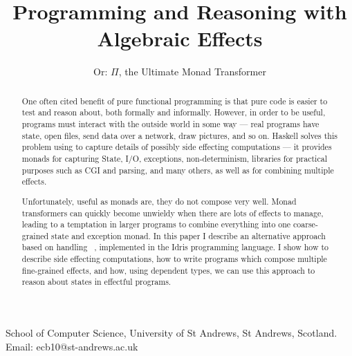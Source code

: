\documentclass[preprint]{sigplanconf}
\newcounter{per}
\begin{document}
\title{Programming and Reasoning with Algebraic Effects}
\subtitle{Or: $\Pi$, the Ultimate Monad Transformer}
{School of Computer Science, 
University of St Andrews, St Andrews, Scotland.}
{Email: ecb10@st-andrews.ac.uk}

\maketitle

\begin{abstract}
One often cited benefit of pure functional programming is that pure code is
easier to test and reason about, both formally and informally. However, in
order to be useful, programs must interact with the outside world in some way
--- real programs have state, open files, send data over a network, draw
pictures, and so on. Haskell solves this problem using  to capture
details of possibly side effecting computations --- it provides monads for
capturing State, I/O, exceptions, non-determinism, libraries for practical
purposes such as CGI and parsing, and many others, as well as  for combining multiple effects.

Unfortunately, useful as monads are, they do not compose very well. Monad
transformers can quickly become unwieldy when there are lots of effects to
manage, leading to a temptation in larger programs to combine everything into
one coarse-grained state and exception monad. In this paper I describe an
alternative approach based on handling ~, implemented
in the Idris programming language. I show how to describe side effecting
computations, how to write programs which compose multiple fine-grained
effects, and how, using dependent types, we can use this approach to reason
about states in effectful programs.
\end{abstract}








%




\end{document}
